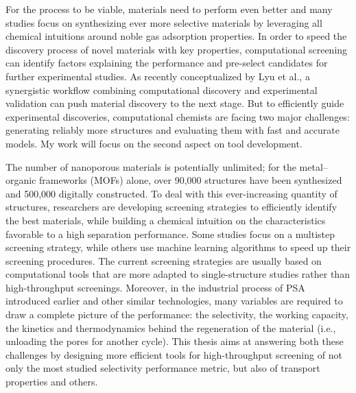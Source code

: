 For the process to be viable, materials need to perform even better and many studies focus on synthesizing ever more selective materials by leveraging all chemical intuitions around noble gas adsorption properties.\autocite{Chen_2014, Li_2019, Pei_2022} In order to speed the discovery process of novel materials with key properties, computational screening can identify factors explaining the performance and pre-select candidates for further experimental studies. As recently conceptualized by Lyu et al., a synergistic workflow combining computational discovery and experimental validation can push material discovery to the next stage.\autocite{Lyu_2020, Jablonka_2022} But to efficiently guide experimental discoveries, computational chemists are facing two major challenges: generating reliably more structures and evaluating them with fast and accurate models. My work will focus on the second aspect on tool development.

The number of nanoporous materials is potentially unlimited; for the metal--organic frameworks (MOFs) alone, over 90,000 structures have been synthesized\autocite{Groom_2016} and 500,000 digitally constructed\autocite{Wilmer_2012,Boyd_2016,Colon_2017}. To deal with this ever-increasing quantity of structures, researchers are developing screening strategies to efficiently identify the best materials, while building a chemical intuition on the characteristics favorable to a high separation performance. Some studies focus on a multistep screening strategy,\autocite{Wilmer_2012,Qiao_2016,Yang_2020} while others use machine learning algorithms to speed up their screening procedures.\autocite{Fernandez_2013,Simon_2015,Rosen_2021} The current screening strategies are usually based on computational tools that are more adapted to single-structure studies rather than high-throughput screenings. Moreover, in the industrial process of PSA introduced earlier and other similar technologies, many variables are required to draw a complete picture of the performance: the selectivity, the working capacity, the kinetics and thermodynamics behind the regeneration of the material (i.e., unloading the pores for another cycle).\autocite{Kumar_1994} This thesis aims at answering both these challenges by designing more efficient tools for high-throughput screening of not only the most studied selectivity performance metric, but also of transport properties and others. 


\begin{center}
\end{center}

